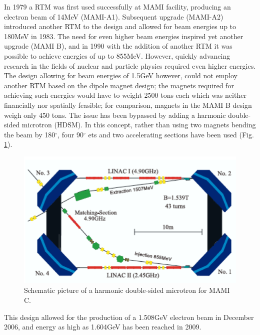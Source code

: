 In 1979 a RTM was first used successfully at MAMI facility, producing an electron beam of 14MeV (MAMI-A1). Subsequent upgrade (MAMI-A2) introduced another RTM to the design and allowed for beam energies up to 180MeV in 1983. The need for even higher beam energies inspired yet another upgrade (MAMI B), and in 1990 with the addition of another RTM it was possible to achieve energies of up to 855MeV. However, quickly advancing research in the fields of nuclear and particle physics required even higher energies. The design allowing for beam energies of 1.5GeV however, could not employ another RTM based on the dipole magnet design; the magnets required for achieving such energies would have to weight 2500 tons each which was neither financially nor spatially feasible; for comparison, magnets in the MAMI B design weigh only 450 tons. The issue has been bypassed by adding a harmonic double-sided microtron (HDSM). In this concept, rather than using two magnets bending the beam by 180$^{\circ}$, four 90$^{\circ}$ ets and two accelerating sections have been used (Fig. \ref{mamic}). 

\begin{figure}[H]
\begin{center}
\includegraphics[scale=0.25]{pictures/png/HDSM.png}
\caption{Schematic picture of a harmonic double-sided microtron for MAMI C.}
\label{mamic}
\end{center}
\end{figure}

This design allowed for the production of a 1.508GeV electron beam in December 2006, and energy as high as 1.604GeV has been reached in 2009.

